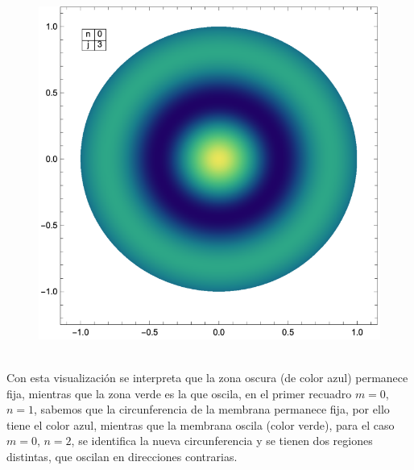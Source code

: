 \begin{minipage}{0.3\linewidth}
\begin{figure}[H]
    \centering
    \includegraphics[scale=0.5]{Imagenes/Vibracion_Membrana_03.eps}
\end{figure}
\end{minipage}
\\[0.5em]
Con esta visualización se interpreta que la zona oscura (de color azul) permanece fija, mientras que la zona verde es la que oscila, en el primer recuadro $m = 0$, $n = 1$, sabemos que la circunferencia de la membrana permanece fija, por ello tiene el color azul, mientras que la membrana oscila (color verde), para el caso $m = 0$, $n = 2$, se identifica la nueva circunferencia y se tienen dos regiones distintas, que oscilan en direcciones contrarias.
